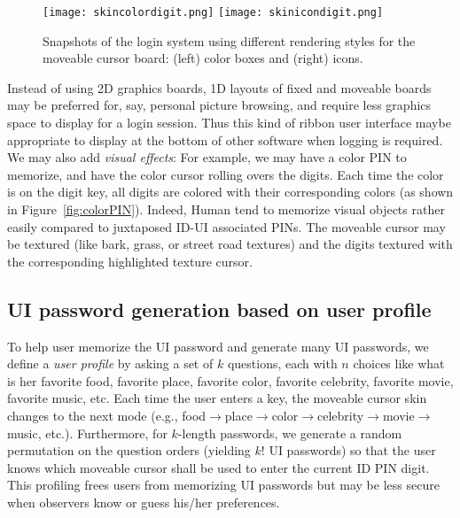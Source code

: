 \documentclass[12pt,onecolumn]{article}
\begin{document}
\begin{figure}
\centering
 \texttt{[image: skincolordigit.png]}  
 \texttt{[image: skinicondigit.png]} 
\caption{
Snapshots of the login system using different rendering styles for the moveable cursor board: (left) color boxes and (right) icons. 
\label{fig:skins}}
\end{figure} 


Instead of using 2D graphics boards, 1D layouts of fixed and moveable boards may be preferred for, say, personal picture browsing, and require less graphics space to display for a login session.
Thus this kind of ribbon user interface maybe appropriate to display at the bottom of other software when logging is required.
We may also add {\em visual effects}: For example, we may have a color PIN to memorize, and have the color cursor rolling overs the digits.
Each time the color is on the digit key, all digits are colored with their corresponding colors (as shown in Figure~\ref{fig:colorPIN}). 
Indeed, Human tend to memorize visual objects rather easily compared to juxtaposed ID-UI associated PINs.
The moveable cursor may be textured (like bark, grass, or street road textures) and the digits textured with the corresponding highlighted texture cursor.
 


\subsection{UI password generation based on user profile\label{sec:userprofile}}

To help user memorize the UI password and generate many UI passwords, we define a {\em user profile} by asking a set of $k$ questions, each with $n$ choices like what is her favorite food, favorite place, favorite color, favorite celebrity, favorite movie, favorite music, etc.
Each time the user enters a key, the moveable cursor skin changes to the next mode (e.g., food$\rightarrow$place$\rightarrow$color$\rightarrow$celebrity$\rightarrow$movie$\rightarrow$music, etc.).
Furthermore, for $k$-length passwords, we generate a random permutation on the question orders (yielding $k!$ UI passwords) so that the user knows which moveable cursor shall be used to enter the current ID PIN digit.
This profiling frees users from memorizing   UI passwords but may be less secure when observers know or guess his/her preferences.
 
\end{document}
